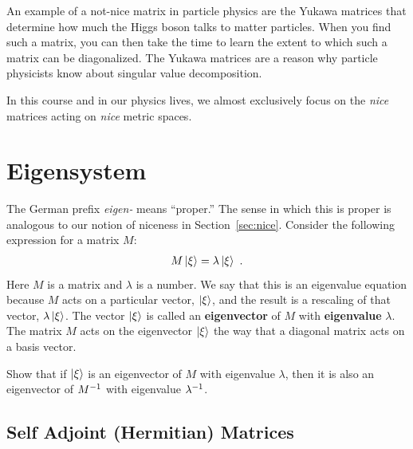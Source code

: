 \documentclass[12pt]{article}
\begin{document}
\begin{example}
An example of a not-nice matrix in particle physics are the Yukawa matrices that determine how much the Higgs boson talks to matter particles. When you find such a matrix, you can then take the time to learn the extent to which such a matrix can be diagonalized. The Yukawa matrices are a reason why particle physicists know about singular value decomposition.
\end{example}

\vspace{1em}

In this course and in our physics lives, we almost exclusively focus on the \emph{nice} matrices acting on \emph{nice} metric spaces. 



\section{Eigensystem}
\label{sec:eigensystem}

The German prefix \emph{eigen-} means ``proper.'' The sense in which this is proper is analogous to our notion of niceness in Section~\ref{sec:nice}. Consider the following expression for a matrix $M$:
\begin{align}
    M\left|\xi\right\rangle = \lambda\left|\xi\right\rangle \ .
\end{align}
Here $M$ is a matrix and $\lambda$ is a number. We say that this is an eigenvalue equation because $M$ acts on a particular vector, $\left|\xi\right\rangle$, and the result is a rescaling of that vector, $\lambda\left|\xi\right\rangle$. The vector $\left|\xi\right\rangle$ is called an \textbf{eigenvector} of $M$ with \textbf{eigenvalue} $\lambda$.  The matrix $M$ acts on the eigenvector $\left|\xi\right\rangle$ the way that a diagonal matrix acts on a basis vector.
 
\begin{exercise}
Show that if $\left|\xi\right\rangle$ is an eigenvector of $M$ with eigenvalue $\lambda$, then it is also an eigenvector of $M^{-1}$ with eigenvalue $\lambda^{-1}$. 
\end{exercise}

\subsection{Self Adjoint (Hermitian) Matrices}
\end{document}
